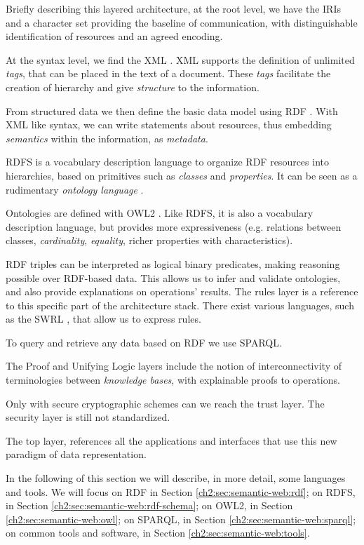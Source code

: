 Briefly describing this layered architecture, at the root level, we have the \gls{IRI}s and a character set providing the baseline of communication, with distinguishable identification of resources and an agreed encoding.

At the syntax level, we find the \gls{XML} \autocite{W3c_undated-ep}. \gls{XML} supports the definition of unlimited \emph{tags}, that can be placed in the text of a document. These \emph{tags} facilitate the creation of hierarchy and give \emph{structure} to the information.

From structured data we then define the basic data model using \gls{RDF} \autocite{W3c_undated-vq}. With \gls{XML} like syntax, we can write statements about resources, thus embedding  \emph{semantics} within the information, as \emph{metadata}.

\gls{RDFS} \autocite{W3c_undated-mp} is a vocabulary description language to organize \gls{RDF} resources into hierarchies, based on primitives such as \emph{classes} and \emph{properties}. It can be seen as a rudimentary \emph{ontology language} \autocite{Antoniou2012-nj}.

Ontologies are defined with \gls{OWL2} \autocite{W3c_undated-dr}. Like \gls{RDFS}, it is also a vocabulary description language, but provides more expressiveness (e.g. relations between classes, \emph{cardinality}, \emph{equality}, richer properties with characteristics).

\gls{RDF} triples can be interpreted as logical binary predicates, making reasoning possible over \gls{RDF}-based data. This allows us to infer and validate ontologies, and also provide explanations on operations' results. The rules layer is a reference to this specific part of the architecture stack. There exist various languages, such as the \gls{SWRL} \autocite{W3c2004-rn}, that allow us to express rules.

To query and retrieve any data based on \gls{RDF} we use \gls{SPARQL}.

The Proof and Unifying Logic layers include the notion of interconnectivity of terminologies between \emph{knowledge bases}, with explainable proofs to operations.

Only with secure cryptographic schemes can we reach the trust layer. The security layer is still not standardized.

The top layer, references all the applications and interfaces that use this new paradigm of data representation.

In the following of this section we will describe, in more detail, some languages and tools. We will focus on \gls{RDF} in Section \ref{ch2:sec:semantic-web:rdf}; on \gls{RDFS}, in Section \ref{ch2:sec:semantic-web:rdf-schema}; on \gls{OWL2}, in Section \ref{ch2:sec:semantic-web:owl}; on \gls{SPARQL}, in Section \ref{ch2:sec:semantic-web:sparql}; on common tools and software, in Section \ref{ch2:sec:semantic-web:tools}.

